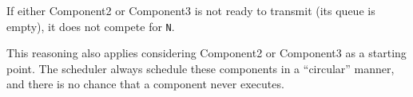 If either Component2 or Component3 is not ready to transmit (its queue is empty), it does not compete for \texttt{N}.

This reasoning also applies considering Component2 or Component3 as a starting point. The scheduler always schedule these components in a ``circular'' manner, and there is no chance that a component never executes.
